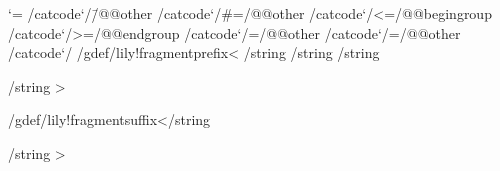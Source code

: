 


\unprotect
\def\??lily{lilypond-}

\bgroup
\catcode`\/=\@@escape
/catcode`/\=/@@other
/catcode`/#=/@@other
/catcode`/<=/@@begingroup
/catcode`/>=/@@endgroup
/catcode`/{=/@@other
/catcode`/}=/@@other
/catcode`/%
/gdef/lily!fragmentprefix<
/string^^J
/string^^J
/string^^J
{/string^^J
>

/gdef/lily!fragmentsuffix</string^^J
}/string^^J
>

